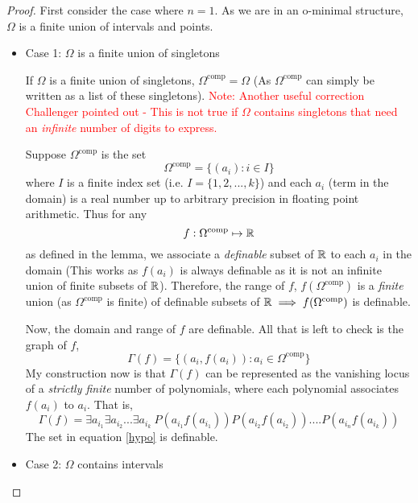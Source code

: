 \begin{definition}
\begin{proof}
    First consider the case where $n = 1$. As we are in an o-minimal structure, $\Omega$ is a finite union of intervals and points.
    \begin{itemize}
        \item Case 1: $\Omega$ is a finite union of singletons

        If $\Omega$ is a finite union of singletons, $\Omega^\text{comp} = \Omega$ (As $\Omega^\text{comp}$ can simply be written as a list of these singletons). 
        \textcolor{red}{Note: Another useful correction Challenger pointed out - This is not true if $\Omega$ contains singletons that need an \textit{infinite} number of digits to express.}
        
        Suppose $\Omega^\text{comp}$ is the set
        \begin{equation*}
            \Omega^\text{comp} = \{(a_i) : i\in I\} 
        \end{equation*}
        where $I$ is a finite index set (i.e. $I = \{1, 2, ..., k\}$) and each $a_i$ (term in the domain) is a real number up to arbitrary precision in floating point arithmetic.
        Thus for any
        \begin{equation*}
            f:\Omega^\text{comp}\mapsto\mathbb{R}
        \end{equation*}
        as defined in the lemma, we associate a \textit{definable} subset of $\mathbb{R}$ to each $a_i$ in the domain (This works as $f(a_i)$ is always definable as it is not an infinite union of finite subsets of $\mathbb{R}$). Therefore, the range of $f$, $f(\Omega^\text{comp})$ is a \textit{finite} union (as $\Omega^\text{comp}$ is finite) of definable subsets of $\mathbb{R}\implies f(\Omega^\text{comp})$ is definable.
        \par Now, the domain and range of $f$ are definable. All that is left to check is the graph of $f$,
        \begin{equation*}
            \Gamma(f) = \{(a_i, f(a_i)): a_i\in\Omega^\text{comp}\}
        \end{equation*}
        My construction now is that $\Gamma(f)$ can be represented as the vanishing locus of a \textit{strictly finite} number of polynomials, where each polynomial associates $f(a_i)$ to $a_i$. That is,
        \begin{equation}
        \label{hypo}
            \Gamma(f) = \exists a_{i_1}\exists a_{i_2}...\exists a_{i_k}\: P(a_{i_1}f(a_{i_1}))P(a_{i_2}f(a_{i_2}))....P(a_{i_n}f(a_{i_k}))
        \end{equation}
        The set in equation \ref{hypo} is definable.
        \item Case 2: $\Omega$ contains intervals


\end{itemize}
\end{proof}
\end{definition}
